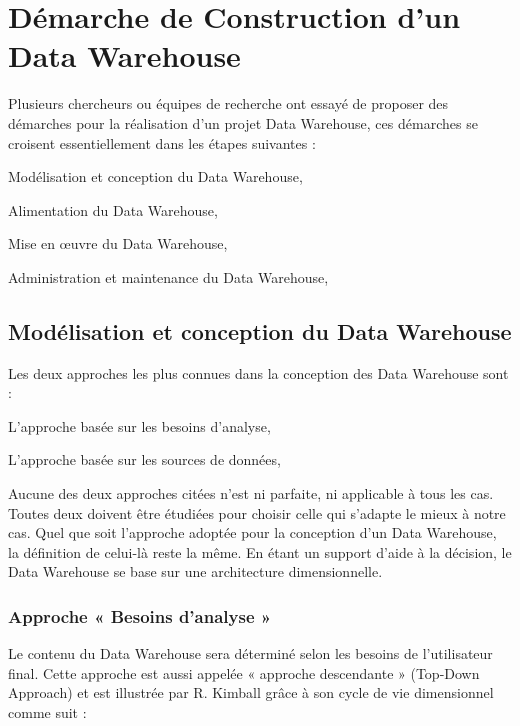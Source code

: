    
   
\section{Démarche de Construction d’un Data Warehouse}   
   Plusieurs chercheurs ou équipes de recherche ont essayé de proposer des démarches pour la réalisation d’un projet Data Warehouse, ces démarches se croisent essentiellement dans les étapes suivantes :
\begin{list}{•}{ }
   \item Modélisation et conception du Data Warehouse,
   \item Alimentation du Data Warehouse,
   \item Mise en œuvre du Data Warehouse,
   \item Administration et maintenance du Data Warehouse,\\
\end{list}

\subsection{Modélisation et conception du Data Warehouse}

Les deux approches les plus connues dans la conception des Data Warehouse sont :
\begin{list}{•}{ }
   \item L’approche basée sur les besoins d’analyse,
    \item L’approche basée sur les sources de données,\\
\end{list}
Aucune des deux approches citées n’est ni parfaite, ni applicable à tous les cas. Toutes deux doivent être étudiées pour choisir celle qui s’adapte le mieux à notre cas. Quel que soit l’approche adoptée pour la conception d’un Data Warehouse, la définition de celui-là reste la même. En étant un support d’aide à la décision, le Data Warehouse se base sur une architecture dimensionnelle.


 \subsubsection{Approche « Besoins d’analyse »}
 
  Le contenu du Data Warehouse sera déterminé selon les besoins de l’utilisateur final. Cette approche est aussi appelée « approche descendante » (Top-Down Approach) et est illustrée par R. Kimball grâce à son cycle de vie dimensionnel comme suit :
  
